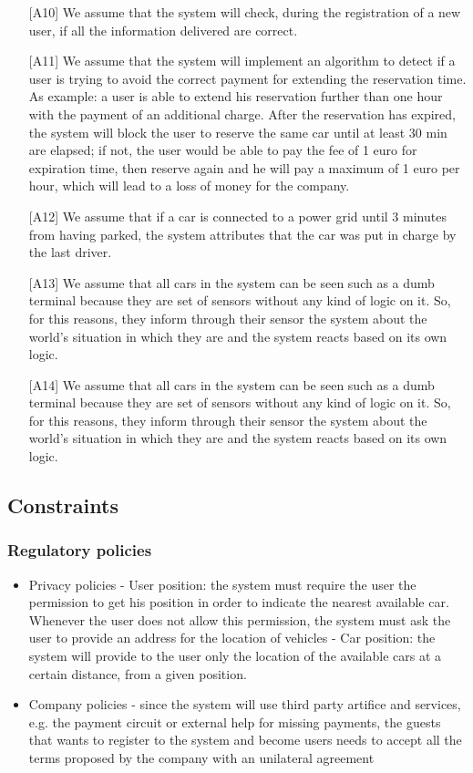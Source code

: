 \documentclass[10pt, a4paper,titlepage]{article}
\begin{document}
\begin{itemize}
\item [{[A10]}] We assume that the system will check, during the registration of a new user, if all the information delivered are correct.
\item [{[A11]}] We assume that the system will implement an algorithm to detect if a user is trying to avoid the correct payment for extending the reservation time. As example: a user is able to extend his reservation further than one hour with the payment of an additional charge. After the reservation has expired, the system will block the user to reserve the same car until at least 30 min are elapsed; if not, the user would be able to pay the fee of 1 euro for expiration time, then reserve again and he will pay a maximum of 1 euro per hour, which will lead to a loss of money for the company.
\item [{[A12]}] We assume that if a car is connected to a power grid until 3 minutes from having parked, the system attributes that the car was put in charge by the last driver.
\item [{[A13]}] We assume that all cars in the system can be seen such as a dumb terminal because they are set of sensors without any kind of logic on it. So, for this reasons, they inform through their sensor the system about the world's situation in which they are and the system reacts based on its own logic.
\item [{[A14]}] We assume that all cars in the system can be seen such as a dumb terminal because they are set of sensors without any kind of logic on it. So, for this reasons, they inform through their sensor the system about the world's situation in which they are and the system reacts based on its own logic.
\end{itemize}
\subsection{Constraints}
\subsubsection{Regulatory policies}
\begin{itemize}
\item Privacy policies
\subitem - User position: the system must require the user the permission to get his position in order to indicate the nearest available car. Whenever the user does not allow this permission, the system must ask the user to provide an address for the location of vehicles
\subitem - Car position: the system will provide to the user only the location of the available cars at a certain distance, from a given position.
\item Company policies
\subitem - since the system will use third party artifice and services, e.g. the payment circuit or external help for missing payments, the guests that wants to register to the system and become users needs to accept all the terms proposed by the company with an unilateral agreement
\end{itemize}
\end{document}
